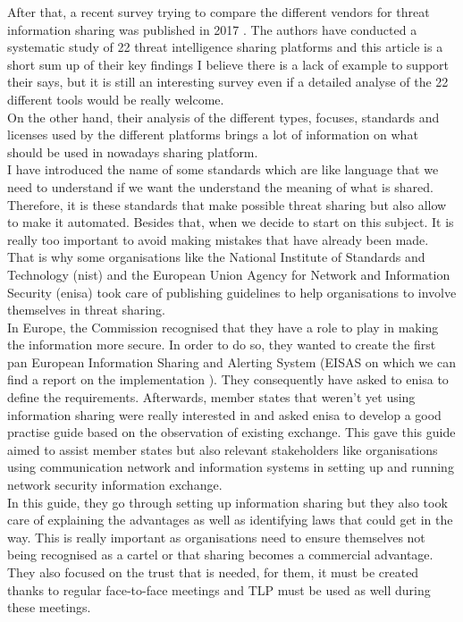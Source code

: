 \documentclass{eplmastersthesis}
\begin{document}
After that, a recent survey trying to compare the different vendors for threat information sharing was published in 2017 \cite{sauerwein2017threat}. The authors have conducted a systematic study of 22 threat intelligence sharing platforms and this article is a short sum up of their key findings I believe there is a lack of example to support their says, but it is still an interesting survey even if a detailed analyse of the 22 different tools would be really welcome.\\
On the other hand, their analysis of the different types, focuses, standards and licenses used by the different platforms brings a lot of information on what should be used in nowadays sharing platform.\\

I have introduced the name of some standards which are like language that we need to understand if we want the understand the meaning of what is shared. Therefore, it is these standards that make possible threat sharing but also allow to make it automated. Besides that, when we decide to start on this subject. It is really too important to avoid making mistakes that have already been made. That is why some organisations like the National Institute of Standards and Technology (\gls{nist}) and the European Union Agency for Network and Information Security (\gls{enisa}) took care of publishing guidelines to help organisations to involve themselves in threat sharing.\\
In Europe, the Commission recognised that they have a role to play in making the information more secure. In order to do so, they wanted to create the first pan European Information Sharing and Alerting System (EISAS on which we can find a report on the implementation \cite{eisasRapport}).  They consequently have asked to \gls{enisa} to define the requirements. Afterwards, member states that weren't yet using information sharing were really interested in and asked \gls{enisa} to develop a good practise guide based on the observation of existing exchange. This gave this guide \cite{enisaguide2009} aimed to assist member states but also relevant stakeholders like organisations using communication network and information systems in setting up and running network security information exchange.\\
In this guide, they go through setting up information sharing but they also took care of explaining the advantages as well as identifying laws that could get in the way. This is really important as organisations need to ensure themselves not being recognised as a cartel or that sharing becomes a commercial advantage. They also focused on the trust that is needed, for them, it must be created thanks to regular face-to-face meetings and TLP must be used as well during these meetings.\\
\end{document}
